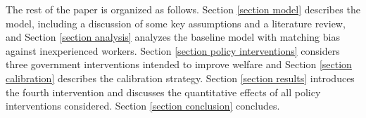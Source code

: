 \documentclass[12pt]{article} %
\theoremstyle{definition}
\begin{document}



The rest of the paper is organized as follows. Section \ref{section model} describes the model, including a discussion of some key assumptions and a literature review, and Section \ref{section analysis} analyzes the baseline model with matching bias against inexperienced workers. Section \ref{section policy interventions} considers three government interventions intended to improve welfare and Section \ref{section calibration} describes the calibration strategy. Section \ref{section results} introduces the fourth intervention and discusses the quantitative effects of all policy interventions considered. Section \ref{section conclusion} concludes. 




\end{document}
